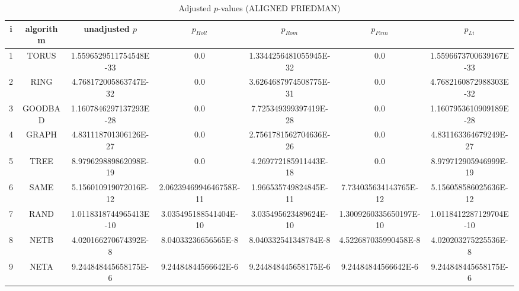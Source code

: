 \documentclass[a4paper,10pt]{article}
\begin{document}
\begin{landscape}
\begin{table}[!htp]
\centering\scriptsize
\caption{Adjusted $p$-values (ALIGNED FRIEDMAN)}
\begin{tabular}{ccccccc}
i&algorithm&unadjusted $p$&$p_{Holl}$&$p_{Rom}$&$p_{Finn}$&$p_{Li}$\\
\hline
1& TORUS&1.5596529511754548E-33&0.0&1.3344256481055945E-32&0.0&1.5596673700639167E-33\\
2& RING&4.768172005863747E-32&0.0&3.6264687974508775E-31&0.0&4.7682160872988303E-32\\
3& GOODBAD&1.1607846297137293E-28&0.0&7.725349399397419E-28&0.0&1.1607953610909189E-28\\
4& GRAPH&4.831118701306126E-27&0.0&2.7561781562704636E-26&0.0&4.831163364679249E-27\\
5& TREE&8.979629889862098E-19&0.0&4.269772185911443E-18&0.0&8.979712905946999E-19\\
6& SAME&5.156010919072016E-12&2.0623946994646758E-11&1.966535749824845E-11&7.734035634143765E-12&5.156058586025636E-12\\
7& RAND&1.0118318744965413E-10&3.035495188541404E-10&3.035495623489624E-10&1.3009260335650197E-10&1.0118412287129704E-10\\
8& NETB&4.020166270674392E-8&8.04033236656565E-8&8.040332541348784E-8&4.522687035990458E-8&4.020203275225536E-8\\
9& NETA&9.244848445658175E-6&9.24484844566642E-6&9.244848445658175E-6&9.24484844566642E-6&9.244848445658175E-6\\
\hline
\end{tabular}
\end{table}


\newpage


\end{landscape}
\end{document}

